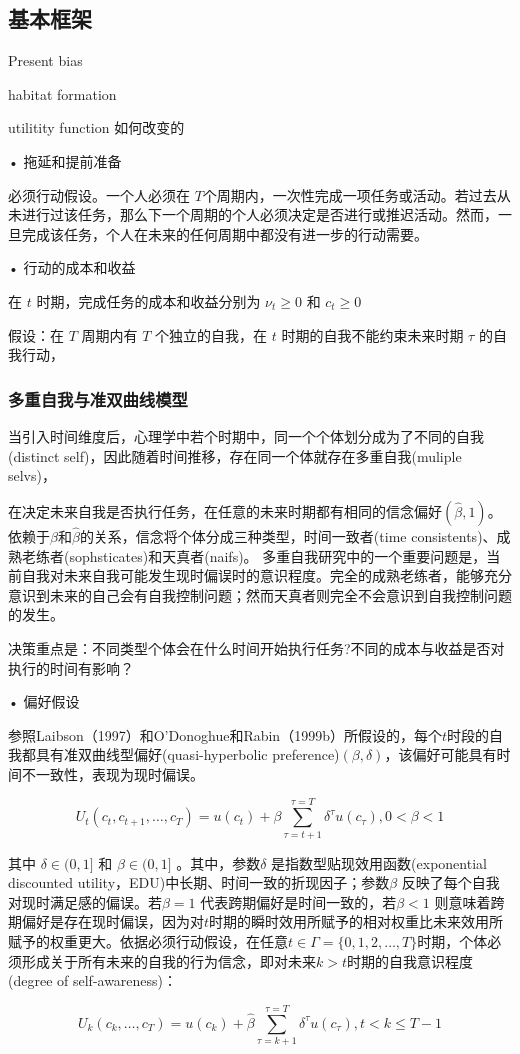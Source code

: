 \subsection{基本框架}

Present bias

habitat formation

utilitity function 如何改变的

• 拖延和提前准备

必须行动假设。一个人必须在 $T$个周期内，一次性完成一项任务或活动。若过去从未进行过该任务，那么下一个周期的个人必须决定是否进行或推迟活动。然而，一旦完成该任务，个人在未来的任何周期中都没有进一步的行动需要。

• 行动的成本和收益

在 $t$ 时期，完成任务的成本和收益分别为 $\nu_t \geq 0$ 和 $c_t \geq 0$

假设：在 $T$ 周期内有 $T$ 个独立的自我，在 $t$ 时期的自我不能约束未来时期 $\tau$ 的自我行动，


\subsubsection{多重自我与准双曲线模型}

当引入时间维度后，心理学中若个时期中，同一个个体划分成为了不同的自我(distinct self)，因此随着时间推移，存在同一个体就存在多重自我(muliple selvs)，


在决定未来自我是否执行任务，在任意的未来时期都有相同的信念偏好$(\hat\beta,1)$。依赖于$\beta$和$\hat\beta$的关系，信念将个体分成三种类型，时间一致者(time consistents)、成熟老练者(sophsticates)和天真者(naifs)。
多重自我研究中的一个重要问题是，当前自我对未来自我可能发生现时偏误时的意识程度。完全的成熟老练者，能够充分意识到未来的自己会有自我控制问题；然而天真者则完全不会意识到自我控制问题的发生。

决策重点是：不同类型个体会在什么时间开始执行任务?不同的成本与收益是否对执行的时间有影响？


• 偏好假设

参照Laibson（1997）和O'Donoghue和Rabin（1999b）所假设的，每个$t$时段的自我都具有准双曲线型偏好(quasi-hyperbolic preference)$(\beta , \delta)$，该偏好可能具有时间不一致性，表现为现时偏误。

$$U_t\left(c_t, c_{t+1}, \ldots, c_T\right)=u\left(c_t\right)+\beta \sum_{\tau=t+1}^{\tau=T} \delta^\tau u\left(c_\tau\right), 0<\beta<1$$

其中 $\delta \in(0,1]$ 和 $\beta \in(0,1]$ 。其中，参数$\delta$ 是指数型贴现效用函数(exponential discounted utility，EDU)中长期、时间一致的折现因子；参数$\beta$ 反映了每个自我对现时满足感的偏误。若$\beta = 1$ 代表跨期偏好是时间一致的，若$\beta < 1$ 则意味着跨期偏好是存在现时偏误，因为对$t$时期的瞬时效用所赋予的相对权重比未来效用所赋予的权重更大。依据必须行动假设，在任意$t \in \Gamma=\{0,1,2, \ldots, T\}$时期，个体必须形成关于所有未来的自我的行为信念，即对未来$k>t$时期的自我意识程度(degree of  self-awareness)：

$$U_k\left(c_k, \ldots, c_T\right)=u\left(c_k\right)+\widehat{\beta} \sum_{\tau=k+1}^{\tau=T} \delta^\tau u\left(c_\tau\right), t<k \leq T-1$$









